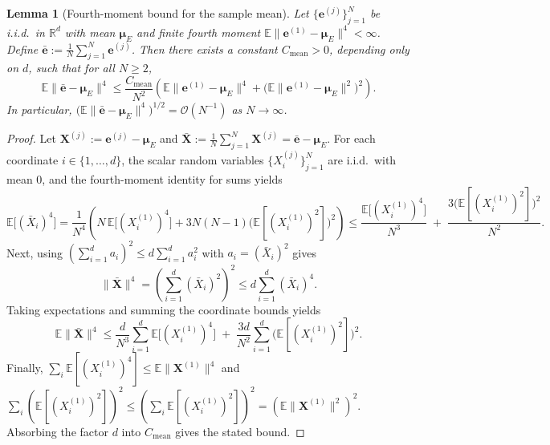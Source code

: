 \documentclass[11pt,a4paper]{article}
\newtheorem{lemma}{Lemma}
\begin{document}
\begin{lemma}[Fourth-moment bound for the sample mean]
\label{lem:sample_mean_fourth_moment}
Let $\{\mathbf{e}^{(j)}\}_{j=1}^N$ be i.i.d.\ in $\mathbb{R}^d$ with mean $\boldsymbol{\mu}_E$ and finite fourth moment $\mathbb{E}\|\mathbf{e}^{(1)}-\boldsymbol{\mu}_E\|^4<\infty$. Define $\bar{\mathbf{e}}:=\frac{1}{N}\sum_{j=1}^N\mathbf{e}^{(j)}$. Then there exists a constant $C_{\mathrm{mean}}>0$, depending only on $d$, such that for all $N\ge 2$,
\begin{equation}
\mathbb{E}\|\bar{\mathbf{e}}-\boldsymbol{\mu}_E\|^4
\le
\frac{C_{\mathrm{mean}}}{N^2}\left(\mathbb{E}\|\mathbf{e}^{(1)}-\boldsymbol{\mu}_E\|^4+\bigl(\mathbb{E}\|\mathbf{e}^{(1)}-\boldsymbol{\mu}_E\|^2\bigr)^2\right).
\end{equation}
In particular, $\bigl(\mathbb{E}\|\bar{\mathbf{e}}-\boldsymbol{\mu}_E\|^4\bigr)^{1/2}=\mathcal{O}(N^{-1})$ as $N\to\infty$.
\end{lemma}

\begin{proof}
Let $\mathbf{X}^{(j)}:=\mathbf{e}^{(j)}-\boldsymbol{\mu}_E$ and $\bar{\mathbf{X}}:=\frac{1}{N}\sum_{j=1}^N\mathbf{X}^{(j)}=\bar{\mathbf{e}}-\boldsymbol{\mu}_E$. For each coordinate $i\in\{1,\ldots,d\}$, the scalar random variables $\{X_i^{(j)}\}_{j=1}^N$ are i.i.d.\ with mean $0$, and the fourth-moment identity for sums yields
\begin{equation}
\mathbb{E}\bigl[(\bar X_i)^4\bigr]
=
\frac{1}{N^4}\left(N\,\mathbb{E}\bigl[(X_i^{(1)})^4\bigr] + 3N(N-1)\bigl(\mathbb{E}[(X_i^{(1)})^2]\bigr)^2\right)
\le
\frac{\mathbb{E}\bigl[(X_i^{(1)})^4\bigr]}{N^3}
\;+\;
\frac{3\bigl(\mathbb{E}[(X_i^{(1)})^2]\bigr)^2}{N^2}.
\end{equation}
Next, using $(\sum_{i=1}^d a_i)^2\le d\sum_{i=1}^d a_i^2$ with $a_i=(\bar X_i)^2$ gives
\begin{equation}
\|\bar{\mathbf{X}}\|^4
=
\left(\sum_{i=1}^d (\bar X_i)^2\right)^2
\le
d\sum_{i=1}^d (\bar X_i)^4.
\end{equation}
Taking expectations and summing the coordinate bounds yields
\begin{equation}
\mathbb{E}\|\bar{\mathbf{X}}\|^4
\le
\frac{d}{N^3}\sum_{i=1}^d \mathbb{E}\bigl[(X_i^{(1)})^4\bigr]
\;+\;
\frac{3d}{N^2}\sum_{i=1}^d \bigl(\mathbb{E}[(X_i^{(1)})^2]\bigr)^2.
\end{equation}
Finally, $\sum_i \mathbb{E}[(X_i^{(1)})^4]\le \mathbb{E}\|\mathbf{X}^{(1)}\|^4$ and
$\sum_i (\mathbb{E}[(X_i^{(1)})^2])^2\le (\sum_i \mathbb{E}[(X_i^{(1)})^2])^2=(\mathbb{E}\|\mathbf{X}^{(1)}\|^2)^2$.
Absorbing the factor $d$ into $C_{\mathrm{mean}}$ gives the stated bound.
\end{proof}
\end{document}
